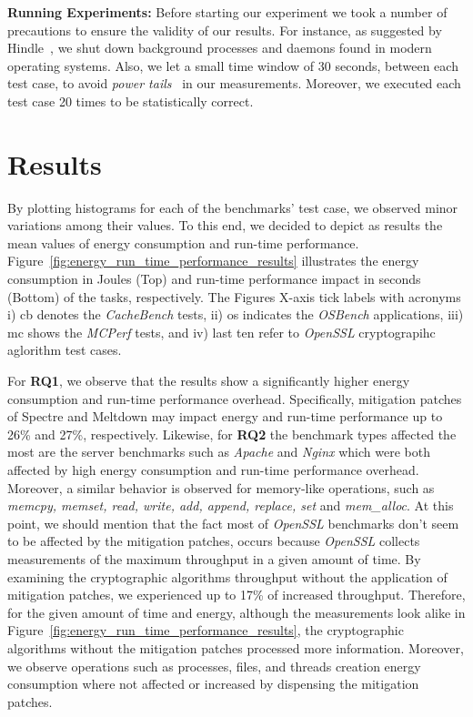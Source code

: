 \documentclass[sigconf, screen]{acmart}
\begin{document}
{\bf Running Experiments:}
Before starting our experiment we took a number of precautions to ensure
the validity of our results.
For instance, as suggested by Hindle~\cite{HWRBCR_2014},
we shut down background processes and daemons found in modern
operating systems.
Also, we let a small time window of 30 seconds, between each test case,
to avoid {\it power tails}~\cite{BMM_2012} in our measurements.
Moreover, we executed each test case 20 times to be statistically correct.

\section{Results}
By plotting histograms for each of the benchmarks' test case,
we observed minor variations among their values.
To this end, we decided to depict as results the mean values
of energy consumption and run-time performance.
Figure~\ref{fig:energy_run_time_performance_results}
illustrates the energy consumption in Joules (Top)
and run-time performance impact in seconds (Bottom) of the tasks, respectively.
The Figures X-axis tick labels with acronyms
i) {\sc cb} denotes the {\it CacheBench} tests,
ii) {\sc os} indicates the {\it OSBench} applications,
iii) {\sc mc} shows the {\it MCPerf} tests,
and iv) last ten refer to {\it OpenSSL} cryptograpihc aglorithm test cases.

For {\bf RQ1}, we observe that the results show a significantly higher
energy consumption and run-time performance overhead.
Specifically, mitigation patches of Spectre and Meltdown
may impact energy and run-time performance up to 26\% and 27\%, respectively.
Likewise, for {\bf RQ2} the benchmark types affected the most are
the server benchmarks such as {\it Apache} and {\it Nginx} which were
both affected by high energy consumption and run-time performance overhead.
Moreover, a similar behavior is observed for memory-like operations,
such as {\it memcpy, memset, read, write, add, append, replace, set}
and {\it mem\_alloc}.
At this point, we should mention that the fact most of {\it OpenSSL} benchmarks
don't seem to be affected by the mitigation patches, 
occurs because {\it OpenSSL} collects measurements
of the maximum throughput in a given amount of time.
By examining the cryptographic algorithms throughput without the application of mitigation patches,
we experienced up to 17\% of increased throughput.
Therefore, for the given amount of time and energy, although the measurements
look alike in Figure~\ref{fig:energy_run_time_performance_results},
the cryptographic algorithms without the mitigation patches processed more information.
Moreover, we observe operations such as processes, files, and threads creation
energy consumption where not affected or increased by dispensing the mitigation patches.
\end{document}

